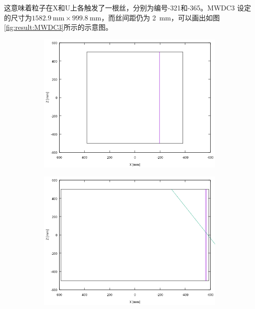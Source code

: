 \documentclass[bachelor,openany,oneside,color]{buaathesis}
\begin{document}
这意味着粒子在X和U上各触发了一根丝，分别为编号-321和-365。MWDC3
设定的尺寸为$\SI{1582.9}{\milli\meter}\times\SI{999.8}{\milli\meter}$，而丝间距仍为
\SI{2}{\milli\meter}，可以画出如图\ref{fig:result:MWDC3}所示的示意图。


\begin{figure}
	\centering
	\begin{subfigure}[c]{0.3\linewidth}
		\includegraphics[width=\textwidth]{./resource/MWDC1-result.png}
		\label{fig:result:MWDC1}
	\end{subfigure}
	\begin{subfigure}[c]{0.3\linewidth}
		\includegraphics[width=\textwidth]{./resource/MWDC2-result.png}

\end{subfigure}
\end{figure}
\end{document}
